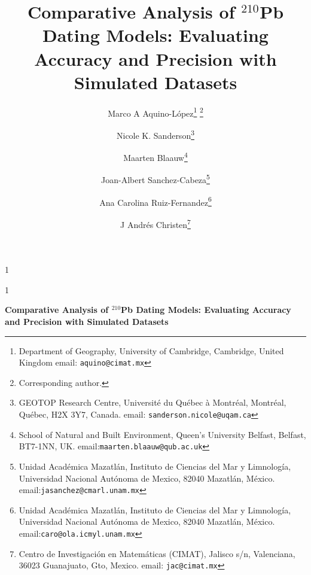 \documentclass [10pt] {article}
\date{ }
\newcommand{\blind}{1}
\newcommand{\papertitle}{
	Comparative Analysis of $^{210}$Pb Dating Models: Evaluating Accuracy and Precision with Simulated Datasets
}
\begin{document}
	\def\spacingset#1{\renewcommand{\baselinestretch}%
		{#1}\small\normalsize} \spacingset{1}
	\blind
	{
		\title{\textbf{\papertitle}}

		\author{Marco A Aquino-L\'opez\thanks{
				Department of Geography, University of Cambridge, 
				Cambridge, United Kingdom
				email: \texttt{aquino@cimat.mx} } \thanks{Corresponding author.}
					\and
			Nicole K. Sanderson\thanks{
				GEOTOP Research Centre, Université du Québec à Montréal, 
				Montréal, Québec, H2X 3Y7, Canada. 
				email: \texttt{sanderson.nicole@uqam.ca}}
					\and
			Maarten Blaauw\thanks{School of Natural and Built Environment,
				Queen's University Belfast,
				Belfast, BT7-1NN, UK.
				email:\texttt{maarten.blaauw@qub.ac.uk}  }
					\and
			Joan-Albert Sanchez-Cabeza\thanks{
				Unidad Acad\'emica Mazatl\'an, 
				Instituto de Ciencias del Mar y Limnolog\'ia, 
				Universidad Nacional Aut\'onoma de Mexico, 
				82040 Mazatl\'an, M\'exico.
				email:\texttt{jasanchez@cmarl.unam.mx}} 
					\and
			Ana Carolina Ruiz-Fernandez\thanks{
				Unidad Acad\'emica Mazatl\'an, 
				Instituto de Ciencias del Mar y Limnolog\'ia, 
				Universidad Nacional Aut\'onoma de Mexico, 
				82040 Mazatl\'an, M\'exico.
				email:\texttt{caro@ola.icmyl.unam.mx}} 
					\and
			J Andr\'es Christen\thanks{
				Centro de Investigaci\'on en Matem\'aticas (CIMAT),
				Jalisco s/n, Valenciana, 36023 Guanajuato, Gto, Mexico.
				email: \texttt{jac@cimat.mx}  }
			}
		\maketitle
	} \fi

	\blind
	{
		\bigskip
		\bigskip
		\bigskip
		\begin{center}
			{\LARGE\bf \papertitle}
		\end{center}
		\medskip
	} \fi
\bigskip
\end{document}
